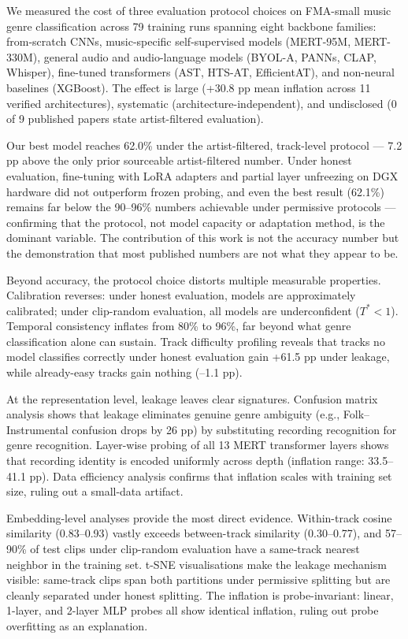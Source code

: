 \documentclass[conference]{IEEEtran}
\begin{document}
We measured the cost of three evaluation protocol choices on FMA-small
music genre classification across 79 training runs spanning eight
backbone families: from-scratch CNNs, music-specific self-supervised
models (MERT-95M, MERT-330M), general audio and audio-language models
(BYOL-A, PANNs, CLAP, Whisper), fine-tuned transformers (AST, HTS-AT,
EfficientAT), and non-neural baselines (XGBoost). The effect is large
(+30.8 pp mean inflation across 11 verified architectures), systematic
(architecture-independent), and undisclosed (0 of 9 published papers
state artist-filtered evaluation).

Our best model reaches 62.0\% under the artist-filtered, track-level
protocol --- 7.2 pp above the only prior sourceable artist-filtered
number. Under honest evaluation, fine-tuning with LoRA adapters and
partial layer unfreezing on DGX hardware did not outperform frozen
probing, and even the best result (62.1\%) remains far below the
90--96\% numbers achievable under permissive protocols ---
confirming that the protocol, not model capacity or adaptation method,
is the dominant variable. The contribution of this work is not the
accuracy number but the demonstration that most published numbers are
not what they appear to be.

Beyond accuracy, the protocol choice distorts multiple measurable
properties. Calibration reverses: under honest evaluation, models are
approximately calibrated; under clip-random evaluation, all models are
underconfident (\(T^* < 1\)). Temporal consistency inflates from 80\% to
96\%, far beyond what genre classification alone can sustain. Track
difficulty profiling reveals that tracks no model classifies correctly
under honest evaluation gain +61.5 pp under leakage, while already-easy
tracks gain nothing (--1.1 pp).

At the representation level, leakage leaves clear signatures. Confusion
matrix analysis shows that leakage eliminates genuine genre ambiguity
(e.g., Folk--Instrumental confusion drops by 26 pp) by substituting
recording recognition for genre recognition. Layer-wise probing of all
13 MERT transformer layers shows that recording identity is encoded
uniformly across depth (inflation range: 33.5--41.1 pp). Data
efficiency analysis confirms that inflation scales with training set
size, ruling out a small-data artifact.

Embedding-level analyses provide the most direct evidence. Within-track
cosine similarity (0.83--0.93) vastly exceeds between-track similarity
(0.30--0.77), and 57--90\% of test clips under clip-random
evaluation have a same-track nearest neighbor in the training set. t-SNE
visualisations make the leakage mechanism visible: same-track clips span
both partitions under permissive splitting but are cleanly separated
under honest splitting. The inflation is probe-invariant: linear,
1-layer, and 2-layer MLP probes all show identical inflation, ruling out
probe overfitting as an explanation.
\end{document}
